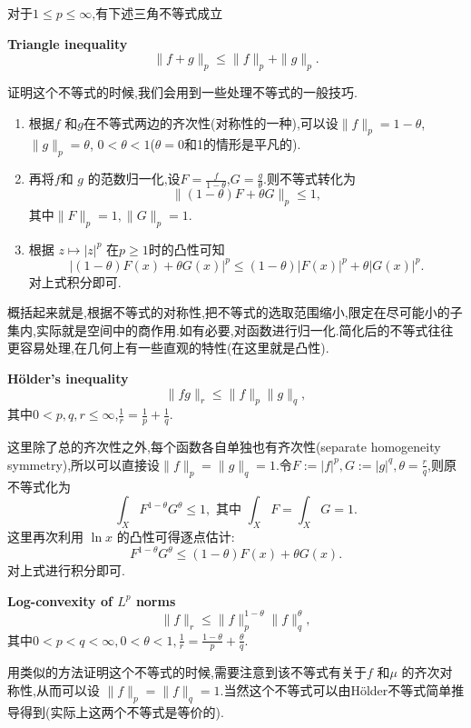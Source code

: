 对于$1\le p\le \infty$,有下述三角不等式成立
\begin{framed}
  \noindent\textbf{Triangle inequality}
  \begin{equation}
  \|f+g\|_{p}\le \|f\|_{p}+\|g\|_{p}.
\end{equation}
\end{framed}
证明这个不等式的时候,我们会用到一些处理不等式的一般技巧.
\begin{enumerate}
  \item 根据$f$ 和$g$在不等式两边的齐次性(对称性的一种),可以设$\|f\|_{p}=1-\theta$,$\|g\|_{p}=\theta$, $0< \theta< 1$($\theta=$0和1的情形是平凡的).
  \item  再将$f$和 $g$ 的范数归一化,设$F=\frac{f}{1-\theta}$,$G=\frac{g}{\theta}$.则不等式转化为
    \[
      \|(1-\theta)F+\theta G\|_{p}\le 1,
    \] 
    其中$\|F\|_p=1, \|G\|_{p}=1$.
  \item 根据 $z\mapsto |z|^{p}$ 在$p\ge 1$时的凸性可知
    \[
      \left| (1-\theta)F(x)+\theta G(x) \right| ^{p}\le (1-\theta)|F(x)|^{p}+\theta |G(x)|^{p}.
    \] 
    对上式积分即可.
\end{enumerate}
概括起来就是,根据不等式的对称性,把不等式的选取范围缩小,限定在尽可能小的子集内,实际就是空间中的商作用.如有必要,对函数进行归一化.简化后的不等式往往更容易处理,在几何上有一些直观的特性(在这里就是凸性).
\begin{framed}
  \noindent \textbf{H\"{o}lder's inequality}
  \begin{equation}
    \|fg\|_{r}\le \|f\|_p \|g\|_q,
  \end{equation}
  其中$0<p,q,r\le \infty$,$\frac{1}{r}=\frac{1}{p}+\frac{1}{q}$.
\end{framed}
这里除了总的齐次性之外,每个函数各自单独也有齐次性(separate homogeneity symmetry),所以可以直接设$\|f\|_{p}=\|g\|_{q}=1$.令$F:=|f|^{p},G:=|g|^{q},\theta = \frac{r}{q}$,则原不等式化为
\[
\int_{X}F^{1-\theta}G^{\theta}\le 1, \text{ 其中 } \int_{X}F=\int_{X}G=1.
\] 
这里再次利用 $\ln x$ 的凸性可得逐点估计:
\[
  F^{1-\theta}G^{\theta}\le (1-\theta)F(x)+\theta G(x).
\] 
对上式进行积分即可.
\begin{framed}
  \noindent\textbf{Log-convexity of $L^{p}$ norms}
  \begin{equation}
    \|f\|_{r}\le \|f\|_{p}^{1-\theta}\|f\|_{q}^{\theta},
  \end{equation}
  其中$0<p<q<\infty,0<\theta<1,\frac{1}{r}=\frac{1-\theta}{p}+\frac{\theta}{q}$.
\end{framed}
用类似的方法证明这个不等式的时候,需要注意到该不等式有关于$f$ 和$\mu$ 的齐次对称性,从而可以设
$\|f\|_p=\|f\|_q=1$.当然这个不等式可以由H\"{o}lder不等式简单推导得到(实际上这两个不等式是等价的).

